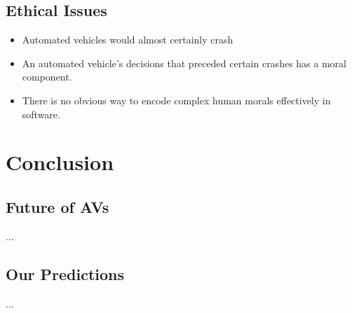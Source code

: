 \documentclass[11pt]{article}
\begin{document}
\subsection{Ethical Issues}
\begin{itemize}
\item Automated vehicles would almost certainly crash
\item An automated vehicle's decisions that preceded certain crashes has a moral component. 
\item There is no obvious way to encode complex human morals effectively in software. 
\end{itemize}
\cite{Goodall:14}

\section{Conclusion}
\subsection{Future of AVs}
...
\subsection{Our Predictions}
...


%
%
\end{document}
